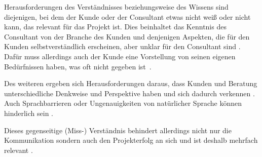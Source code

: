\documentclass[../main.tex]{subfiles}
\begin{document}
Herausforderungen des Verständnisses beziehungsweise des Wissens sind diejenigen, bei dem der Kunde oder der Consultant etwas nicht weiß oder nicht kann, das relevant für das Projekt ist.
Dies beinhaltet das Kenntnis des Consultant von der Branche des Kunden und denjenigen Aspekten, die für den Kunden selbstverständlich erscheinen, aber unklar für den Consultant sind \autocite{appelbaum2005critical, gamil2017identification, davis2006communication, sutter2019consultants}.
Dafür muss allerdings auch der Kunde eine Vorstellung von seinen eigenen Bedürfnissen haben, was oft nicht gegeben ist \autocite{davis2006communication}.

Des weiteren ergeben sich Herausforderungen daraus, dass Kunden und Beratung unterschiedliche Denkweise und Perspektive haben und sich dadurch verkennen \autocite{sutter2019consultants}.
Auch Sprachbarrieren oder Ungenauigkeiten von natürlicher Sprache können hinderlich sein \autocite{sayer2013misunderstanding,gamil2017identification}.

Dieses gegenseitige (Miss-) Verständnis behindert allerdings nicht nur die Kommunikation sondern auch den Projekterfolg an sich und ist deshalb mehrfach relevant \autocite{appelbaum2005critical}.
\end{document}
